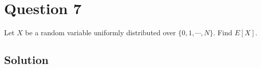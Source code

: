\section*{Question 7}

Let \( X \) be a random variable uniformly distributed over \( \{0,1, \cdots, N\} \).
Find \( E[X] \).

\subsection*{Solution}
